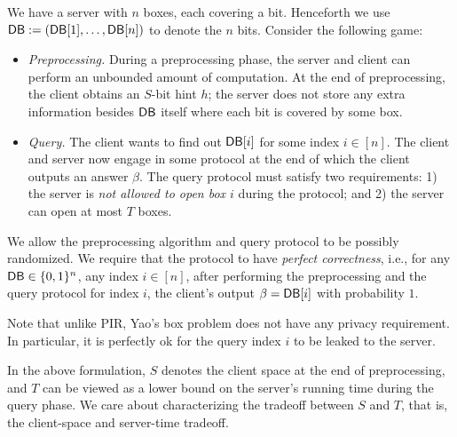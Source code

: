 We have a server with $n$ boxes, each covering a bit. 
Henceforth we use ${\sf DB} := ({\sf DB}[1], \ldots, {\sf DB}[n])$ to denote the $n$ bits.
Consider the following game:
\begin{itemize}[leftmargin=5mm]
\item 
{\it Preprocessing.}
During a preprocessing phase, the server and client can 
perform an unbounded amount of computation. At the end of
preprocessing, the client obtains an $S$-bit hint $h$;
the server does not store any extra information
besides ${\sf DB}$ itself where each bit is covered by some box. 
\item 
{\it Query.}
The client wants to find out  
${\sf DB}[i]$ for some index $i \in [n]$.
The client and server 
now engage in some protocol at the end of which the client outputs
an answer $\beta$.
The query protocol must satisfy two requirements:
1) the server is {\it not allowed to open box $i$}
during the protocol; and 2) the server 
can open at most $T$ boxes.
\end{itemize}

We allow the preprocessing algorithm and query 
protocol to be possibly randomized.
We require that the protocol to have {\it perfect correctness},
i.e., for any ${\sf DB} \in \{0, 1\}^n$, 
any index $i \in [n]$, 
after performing the preprocessing and 
the query protocol for index $i$, the client's output $\beta = {\sf DB}[i]$ with 
probability $1$. 


Note that unlike PIR, 
Yao's box problem does not have any privacy requirement.
In particular, it is perfectly ok for the query 
index $i$ to be leaked
to the server.




In the above formulation, $S$ denotes the client space
at the end of preprocessing, and $T$ can be viewed as a lower bound on the 
server's running time during the query phase. 
We care about characterizing the tradeoff between $S$ and $T$,
that is, the client-space and server-time tradeoff.

